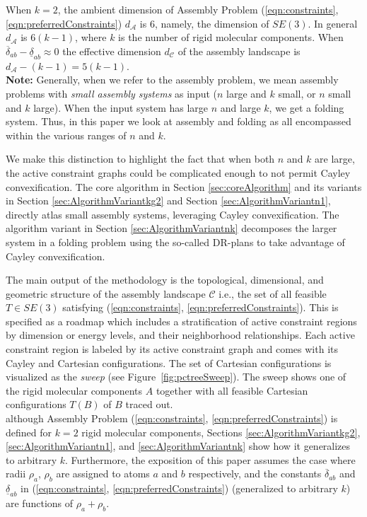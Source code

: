 \documentclass[]{article}
\newcommand{\figref}[1]{Figure~\ref{#1}}
\newcommand{\dst}{\delta}  \newcommand{\dlo}{\underline{\dst}}
\newcommand{\dhi}{\overline{\dst}}
\newcommand{\rmc}{rigid molecular component}
\newcommand{\ctwo}{\ref{eqn:preferredConstraints}}
\newcommand{\cone}{\ref{eqn:constraints}}
\newcommand{\psone}{A}
\newcommand{\pstwo}{B}
\newcommand{\pone}{a}
\newcommand{\ptwo}{b}
\newcommand{\ijx}{{\pone\ptwo}}
\begin{document}
When $k=2$, the ambient dimension of Assembly Problem (\cone, \ctwo) $d_\mathcal{A}$
is 6, namely, the dimension of $SE(3)$. In general $d_\mathcal{A}$ is $6(k-1)$, where $k$ is
the number of \rmc s. When $\dhi_\ijx -\dlo_\ijx \approx 0$ the effective
dimension $d_\mathcal{C}$ of the assembly landscape is $d_\mathcal{A} - (k-1) = 5(k-1)$.\\

\noindent\textbf{Note:} Generally, when we refer to the assembly problem, we mean 
assembly problems with \emph{small assembly systems} as input ($n$ large and $k$
small, or $n$ small and $k$ large). When the input system has large $n$ and 
large $k$, we get a folding system. Thus, in this paper we look at assembly and 
folding as all encompassed within the various ranges of $n$ and $k$. 

We make this distinction to highlight the fact that when both $n$ and $k$ are 
large, the active constraint graphs could be complicated enough to not permit
Cayley convexification. The core algorithm in Section
\ref{sec:coreAlgorithm} and its variants in Section \ref{sec:AlgorithmVariantkg2} 
and Section \ref{sec:AlgorithmVariantn1}, directly atlas small assembly systems, 
leveraging Cayley convexification. The algorithm variant in Section 
\ref{sec:AlgorithmVariantnk}  decomposes the larger system in a folding 
problem using the so-called DR-plans to take advantage of Cayley convexification.


The main output of the methodology is the topological, dimensional, and
geometric structure of the assembly landscape $\mathcal{C}$ i.e., the set of
all feasible $T \in SE(3)$ satisfying (\cone, \ctwo). This is specified
as a roadmap which includes a stratification of active constraint regions by
dimension or energy levels, and their neighborhood relationships.
Each active constraint region is labeled by its active constraint graph and
comes with its Cayley and Cartesian configurations.
The set of Cartesian configurations is visualized as the \emph{sweep} (see
\figref{fig:pctreeSweep}). The sweep shows one of the rigid molecular components 
$\psone$ together with all feasible Cartesian configurations $T(\pstwo)$ of $\pstwo$ 
traced out.\\

although Assembly Problem (\cone, \ctwo) is defined for $k=2$ \rmc s, Sections
\ref{sec:AlgorithmVariantkg2}, \ref{sec:AlgorithmVariantn1}, and
\ref{sec:AlgorithmVariantnk} show how it generalizes to arbitrary $k$.
Furthermore, the exposition of this paper assumes the case where radii
$\rho_a$, $\rho_b$ are assigned to atoms $a$ and $b$ respectively, and the
constants $\dhi_\ijx$ and $\dlo_\ijx$ in (\cone, \ctwo) (generalized to arbitrary $k$) 
are functions of $\rho_a + \rho_b$. 
\end{document}
